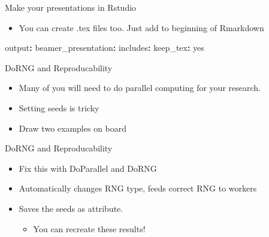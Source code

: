\documentclass[ignorenonframetext,]{beamer}
\newenvironment{Shaded}{\begin{snugshade}}{\end{snugshade}}
\newcommand{\NormalTok}[1]{#1}
\newcommand{\OperatorTok}[1]{\textcolor[rgb]{0.81,0.36,0.00}{\textbf{#1}}}
\newcommand{\StringTok}[1]{\textcolor[rgb]{0.31,0.60,0.02}{#1}}
\providecommand{\tightlist}{%
  \setlength{\itemsep}{0pt}\setlength{\parskip}{0pt}}
\begin{document}
\begin{frame}[fragile]{Make your presentations in Rstudio}
\protect\hypertarget{make-your-presentations-in-rstudio-4}{}

\begin{itemize}
\tightlist
\item
  You can create .tex files too. Just add to beginning of Rmarkdown
\end{itemize}

\begin{Shaded}
\begin{Highlighting}[]
\NormalTok{output}\OperatorTok{:}
\StringTok{  }\NormalTok{beamer_presentation}\OperatorTok{:}
\StringTok{    }\NormalTok{includes}\OperatorTok{:}
\StringTok{    }\NormalTok{keep_tex}\OperatorTok{:}\StringTok{ }\NormalTok{yes}
\end{Highlighting}
\end{Shaded}

\end{frame}

\begin{frame}{DoRNG and Reproducability}
\protect\hypertarget{dorng-and-reproducability}{}

\begin{itemize}
\item
  Many of you will need to do parallel computing for your research.
\item
  Setting seeds is tricky
\item
  Draw two examples on board
\end{itemize}

\end{frame}

\begin{frame}{DoRNG and Reproducability}
\protect\hypertarget{dorng-and-reproducability-1}{}

\begin{itemize}
\item
  Fix this with DoParallel and DoRNG
\item
  Automatically changes RNG type, feeds correct RNG to workers
\item
  Saves the \alert{seeds as attribute}.

  \begin{itemize}
  \tightlist
  \item
    You can recreate these results!
  \end{itemize}
\end{itemize}

\end{frame}
\end{document}
